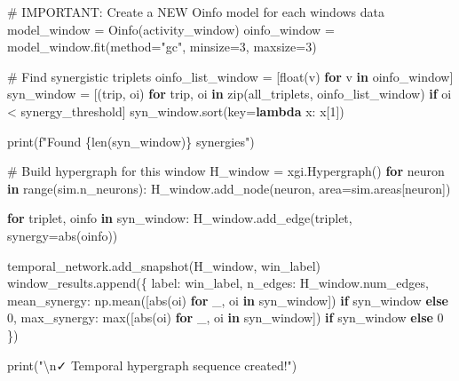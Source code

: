 \documentclass[
  11pt,
  letterpaper,
  oneside,
  openany]{book}
\newenvironment{Shaded}{\begin{snugshade}}{\end{snugshade}}
\newcommand{\BuiltInTok}[1]{\textcolor[rgb]{0.00,0.23,0.31}{#1}}
\newcommand{\CharTok}[1]{\textcolor[rgb]{0.13,0.47,0.30}{#1}}
\newcommand{\CommentTok}[1]{\textcolor[rgb]{0.37,0.37,0.37}{#1}}
\newcommand{\ControlFlowTok}[1]{\textcolor[rgb]{0.00,0.23,0.31}{\textbf{#1}}}
\newcommand{\DecValTok}[1]{\textcolor[rgb]{0.68,0.00,0.00}{#1}}
\newcommand{\KeywordTok}[1]{\textcolor[rgb]{0.00,0.23,0.31}{\textbf{#1}}}
\newcommand{\NormalTok}[1]{\textcolor[rgb]{0.00,0.23,0.31}{#1}}
\newcommand{\OperatorTok}[1]{\textcolor[rgb]{0.37,0.37,0.37}{#1}}
\newcommand{\SpecialCharTok}[1]{\textcolor[rgb]{0.37,0.37,0.37}{#1}}
\newcommand{\SpecialStringTok}[1]{\textcolor[rgb]{0.13,0.47,0.30}{#1}}
\newcommand{\StringTok}[1]{\textcolor[rgb]{0.13,0.47,0.30}{#1}}
\begin{document}
\begin{Shaded}
\begin{Highlighting}[]
    \CommentTok{\# IMPORTANT: Create a NEW Oinfo model for each window\textquotesingle{}s data}
\NormalTok{    model\_window }\OperatorTok{=}\NormalTok{ Oinfo(activity\_window)}
\NormalTok{    oinfo\_window }\OperatorTok{=}\NormalTok{ model\_window.fit(method}\OperatorTok{=}\StringTok{"gc"}\NormalTok{, minsize}\OperatorTok{=}\DecValTok{3}\NormalTok{, maxsize}\OperatorTok{=}\DecValTok{3}\NormalTok{)}
    
    \CommentTok{\# Find synergistic triplets}
\NormalTok{    oinfo\_list\_window }\OperatorTok{=}\NormalTok{ [}\BuiltInTok{float}\NormalTok{(v) }\ControlFlowTok{for}\NormalTok{ v }\KeywordTok{in}\NormalTok{ oinfo\_window]}
\NormalTok{    syn\_window }\OperatorTok{=}\NormalTok{ [(trip, oi) }\ControlFlowTok{for}\NormalTok{ trip, oi }\KeywordTok{in} \BuiltInTok{zip}\NormalTok{(all\_triplets, oinfo\_list\_window)}
                 \ControlFlowTok{if}\NormalTok{ oi }\OperatorTok{\textless{}}\NormalTok{ synergy\_threshold]}
\NormalTok{    syn\_window.sort(key}\OperatorTok{=}\KeywordTok{lambda}\NormalTok{ x: x[}\DecValTok{1}\NormalTok{])}
    
    \BuiltInTok{print}\NormalTok{(}\SpecialStringTok{f"Found }\SpecialCharTok{\{}\BuiltInTok{len}\NormalTok{(syn\_window)}\SpecialCharTok{\}}\SpecialStringTok{ synergies"}\NormalTok{)}
    
    \CommentTok{\# Build hypergraph for this window}
\NormalTok{    H\_window }\OperatorTok{=}\NormalTok{ xgi.Hypergraph()}
    \ControlFlowTok{for}\NormalTok{ neuron }\KeywordTok{in} \BuiltInTok{range}\NormalTok{(sim.n\_neurons):}
\NormalTok{        H\_window.add\_node(neuron, area}\OperatorTok{=}\NormalTok{sim.areas[neuron])}
    
    \ControlFlowTok{for}\NormalTok{ triplet, oinfo }\KeywordTok{in}\NormalTok{ syn\_window:}
\NormalTok{        H\_window.add\_edge(triplet, synergy}\OperatorTok{=}\BuiltInTok{abs}\NormalTok{(oinfo))}
    
\NormalTok{    temporal\_network.add\_snapshot(H\_window, win\_label)}
\NormalTok{    window\_results.append(\{}
        \StringTok{\textquotesingle{}label\textquotesingle{}}\NormalTok{: win\_label,}
        \StringTok{\textquotesingle{}n\_edges\textquotesingle{}}\NormalTok{: H\_window.num\_edges,}
        \StringTok{\textquotesingle{}mean\_synergy\textquotesingle{}}\NormalTok{: np.mean([}\BuiltInTok{abs}\NormalTok{(oi) }\ControlFlowTok{for}\NormalTok{ \_, oi }\KeywordTok{in}\NormalTok{ syn\_window]) }\ControlFlowTok{if}\NormalTok{ syn\_window }\ControlFlowTok{else} \DecValTok{0}\NormalTok{,}
        \StringTok{\textquotesingle{}max\_synergy\textquotesingle{}}\NormalTok{: }\BuiltInTok{max}\NormalTok{([}\BuiltInTok{abs}\NormalTok{(oi) }\ControlFlowTok{for}\NormalTok{ \_, oi }\KeywordTok{in}\NormalTok{ syn\_window]) }\ControlFlowTok{if}\NormalTok{ syn\_window }\ControlFlowTok{else} \DecValTok{0}
\NormalTok{    \})}

\BuiltInTok{print}\NormalTok{(}\StringTok{"}\CharTok{\textbackslash{}n}\StringTok{✓ Temporal hypergraph sequence created!"}\NormalTok{)}
\end{Highlighting}
\end{Shaded}
\end{document}
